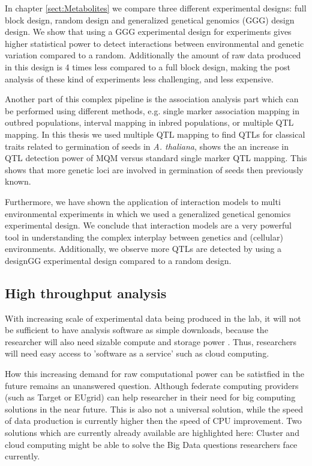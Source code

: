 In chapter \ref{sect:Metabolites} we compare three different experimental designs: full 
block design, random design and generalized genetical genomics (GGG) design design. We show 
that using a GGG experimental design for experiments gives higher statistical power to 
detect interactions between environmental and genetic variation compared to a random. 
Additionally the amount of raw data produced in this design is 4 times less compared to 
a full block design, making the post analysis of these kind of experiments less challenging, 
and less expensive.

Another part of this complex pipeline is the association analysis part which can be performed using 
different methods, e.g. single marker association mapping in outbred populations, interval 
mapping in inbred populations, or multiple QTL mapping. In this thesis we used multiple 
QTL mapping to find QTLs for classical traits related to germination of seeds in 
\emph{A. thaliana}, shows the an increase in QTL detection power of MQM versus standard 
single marker QTL mapping. This shows that more genetic loci are involved in germination 
of seeds then previously known.

Furthermore, we have shown the application of interaction models to multi environmental 
experiments in which we used a generalized genetical genomics experimental design. We 
conclude that interaction models are a very powerful tool in understanding the complex 
interplay between genetics and (cellular) environments. Additionally, we observe more QTLs 
are detected by using a designGG experimental design compared to a random design.

\subsection*{High throughput analysis}
With increasing scale of experimental data being produced in the lab, it will not be 
sufficient to have analysis software as simple downloads, because the researcher will 
also need sizable compute and storage power \cite{Schadt:2010}. Thus, researchers will 
need easy access to 'software as a service' such as cloud computing. 

How this increasing demand for raw computational power can be satistfied in the future remains 
an unanswered question. Although federate computing providers (such as Target or EUgrid) can help 
researcher in their need for big computing solutions in the near future. This is also not a 
universal solution, while the speed of data production is currently higher then the speed of 
CPU improvement. Two solutions which are currently already available are highlighted here: 
Cluster and cloud computing might be able to solve the Big Data questions researchers face 
currently.

